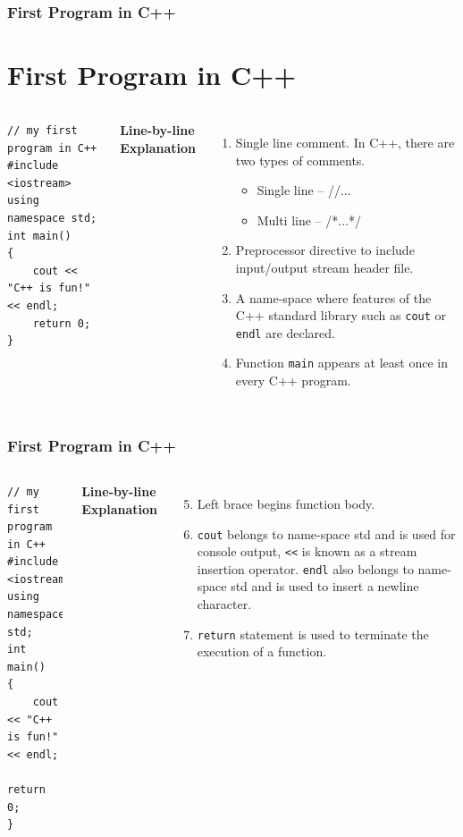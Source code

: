 \documentclass{beamer}
\begin{document}
\begin{frame}[fragile]
    \frametitle{First Program in C++}
    \section{First Program in C++} %
    \label{sec:first_program}
    \begin{columns}
        \lstset{style=mystyle}
        \begin{lstlisting}
// my first program in C++
#include <iostream>
using namespace std;
int main()
{
    cout << "C++ is fun!" << endl;
    return 0;
}\end{lstlisting}
           \textbf{Line-by-line Explanation}
           \begin{enumerate}
               \item Single line comment. In C++, there are two types of comments.
               \begin{itemize}
                   \item Single line -- //...
                   \item Multi line -- /*...*/
               \end{itemize}
               \item Preprocessor directive to include input/output stream header file.
               \item A name-space where features of the C++ standard library such as \texttt{cout} or \texttt{endl} are declared.
               \item Function \texttt{main} appears at least once in every C++ program.
           \end{enumerate}
    \end{columns}
\end{frame}

\begin{frame}[fragile]
    \frametitle{First Program in C++}
    \begin{columns}
        \lstset{style=mystyle}
        \begin{lstlisting}
// my first program in C++
#include <iostream>
using namespace std;
int main()
{
    cout << "C++ is fun!" << endl;
    return 0;
}\end{lstlisting}
           \textbf{Line-by-line Explanation}
           \begin{enumerate}
           \setcounter{enumi}{4}
           \item Left brace begins function body.
           \item \texttt{cout} belongs to name-space std and is used for console output, \texttt{<<} is known as a stream insertion operator. \texttt{endl} also belongs to name-space std and is used to insert a newline character.
            \item \texttt{return} statement is used to terminate the execution of a function.
            \end{enumerate}
    \end{columns}
\end{frame}
\end{document}
